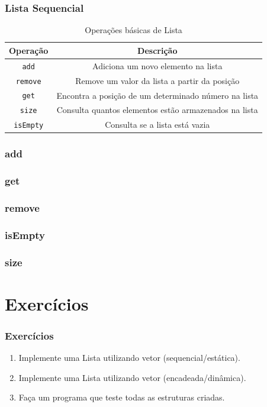 \documentclass{beamer}
\begin{document}
\begin{frame}
	\frametitle{Lista Sequencial}
    \begin{table}
        \caption{Operações básicas de Lista}
        \label{tab:lista}
        \begin{tabular}{| c | c |}
            \hline
            Operação & Descrição \\ \hline
            \texttt{add} & Adiciona um novo elemento na lista \\ \hline
            \texttt{remove} & Remove um valor da lista a partir da posição \\ \hline
            \texttt{get} & Encontra a posição de um determinado número na lista \\ \hline
            \texttt{size} & Consulta quantos elementos estão armazenados na lista \\ \hline
            \texttt{isEmpty} & Consulta se a lista está vazia\\ \hline
        \end{tabular}
    \end{table}
\end{frame}

\begin{frame}
	\frametitle{add}
    \centering
    
\end{frame}

\begin{frame}
	\frametitle{get}
    \centering
    
\end{frame}

\begin{frame}
	\frametitle{remove}
    \centering
    
\end{frame}

\begin{frame}
	\frametitle{isEmpty}
    \centering
    
\end{frame}

\begin{frame}
	\frametitle{size}
    \centering
    
\end{frame}

\section{Exercícios}

\begin{frame}
    \frametitle{Exercícios}
    \begin{enumerate}
        \item Implemente uma Lista utilizando vetor (sequencial/estática).
        \item Implemente uma Lista utilizando vetor (encadeada/dinâmica).
        \item Faça um programa que teste todas as estruturas criadas.
    \end{enumerate}
\end{frame}
\end{document}
